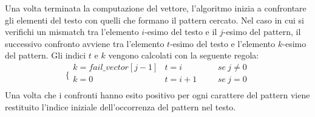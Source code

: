 Una volta terminata la computazione del vettore, l'algoritmo inizia a confrontare gli elementi del testo con quelli che formano il pattern cercato. Nel caso in cui si verifichi un mismatch tra l'elemento $i$-esimo del testo e il $j$-esimo del pattern, il successivo confronto avviene tra l'elemento $t$-esimo del testo e l'elemento $k$-esimo del pattern. Gli indici $t$ e $k$  vengono calcolati con la seguente regola: 
$$
\bigg\{
\begin{array}{llcl}
{k=fail\_vector[j-1]} & {t=i} & {\:\:\:\:} & {se\:j\ne 0} \\
{k=0} & {t=i+1} & {\:\:\:\:} & {se\:j = 0} \\
\end{array}
$$
Una volta che i confronti hanno esito positivo per ogni carattere del pattern viene restituito l'indice iniziale dell'occorrenza del pattern nel testo.\\ \\

